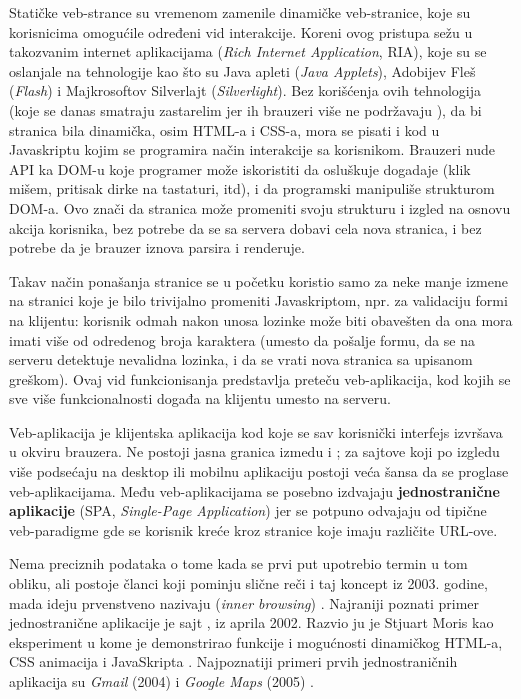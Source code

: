 Statičke veb-strance su vremenom zamenile dinamičke veb-stranice, koje su korisnicima omogućile određeni vid interakcije.
Koreni ovog pristupa sežu u takozvanim  internet aplikacijama (\textsl{Rich Internet Application}, RIA), koje su se oslanjale na tehnologije kao što su Java apleti (\textsl{Java Applets}), Adobijev Fleš (\textsl{Flash}) i Majkrosoftov Silverlajt (\textsl{Silverlight}).
Bez korišćenja ovih tehnologija (koje se danas smatraju zastarelim jer ih brauzeri više ne podržavaju \cite{death-of-flash}), da bi stranica bila dinamička, osim HTML-a i CSS-a, mora se pisati i kod u Javaskriptu kojim se programira način interakcije sa korisnikom.
Brauzeri nude API ka DOM-u koje programer može iskoristiti da osluškuje dogadaje (klik mišem, pritisak dirke na tastaturi, itd), i da programski manipuliše strukturom DOM-a.
Ovo znači da stranica može promeniti svoju strukturu i izgled na osnovu akcija korisnika, bez potrebe da se sa servera dobavi cela nova stranica, i bez potrebe da je brauzer iznova parsira i renderuje.

Takav način ponašanja stranice se u početku koristio samo za neke manje izmene na stranici koje je bilo trivijalno promeniti Javaskriptom, npr. za validaciju formi na klijentu: korisnik odmah nakon unosa lozinke može biti obavešten da ona mora imati više od odredenog broja karaktera (umesto da pošalje formu, da se na serveru detektuje nevalidna lozinka, i da se vrati nova stranica sa upisanom greškom).
Ovaj vid funkcionisanja predstavlja preteču veb-aplikacija, kod kojih se sve više funkcionalnosti događa na klijentu umesto na serveru.

Veb-aplikacija je klijentska aplikacija kod koje se sav korisnički interfejs izvršava u okviru brauzera.
Ne postoji jasna granica izmedu  i ; za sajtove koji po izgledu više podsećaju na desktop ili mobilnu aplikaciju postoji veća šansa da se proglase veb-aplikacijama.
Među veb-aplikacijama se posebno izdvajaju \textbf{jednostranične aplikacije} (SPA, \textsl{Single-Page Application}) jer se potpuno odvajaju od tipične veb-paradigme gde se korisnik kreće kroz stranice koje imaju različite URL-ove.

Nema preciznih podataka o tome kada se prvi put upotrebio termin  u tom obliku, ali postoje članci koji pominju slične reči i taj koncept iz 2003. godine, mada ideju prvenstveno nazivaju  (\textsl{inner browsing}) \cite{mdn:inner-browsing}.
Najraniji poznati primer jednostranične aplikacije je sajt , iz aprila 2002.
Razvio ju je Stjuart  Moris kao eksperiment u kome je demonstrirao funkcije i mogućnosti dinamičkog HTML-a, CSS animacija i JavaSkripta \cite{slashdotslash}.
Najpoznatiji primeri prvih jednostraničnih aplikacija su \textsl{Gmail} (2004) i \textsl{Google Maps} (2005) \cite{aaronsw:ajax-history}.

